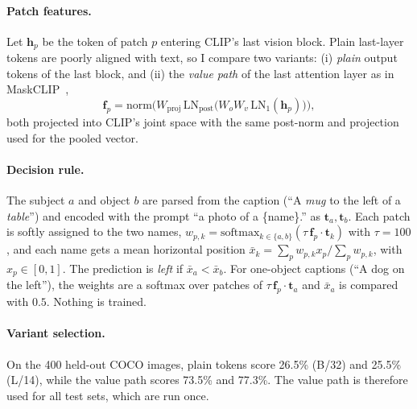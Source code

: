 \documentclass[10pt,twocolumn,letterpaper]{article}
\begin{document}
\paragraph{Patch features.}
Let $\mathbf{h}_p$ be the token of patch $p$ entering CLIP's last vision block.
Plain last-layer tokens are poorly aligned with text, so I compare two variants:
(i) \emph{plain} output tokens of the last block, and
(ii) the \emph{value path} of the last attention layer as in MaskCLIP~\cite{zhou2022maskclip},
\begin{equation}
\mathbf{f}_p = \mathrm{norm}\big(W_\text{proj}\,\mathrm{LN}_\text{post}\big(W_o W_v\,\mathrm{LN}_1(\mathbf{h}_p)\big)\big),
\end{equation}
both projected into CLIP's joint space with the same post-norm and projection used for the pooled vector.

\paragraph{Decision rule.}
The subject $a$ and object $b$ are parsed from the caption (``A \emph{mug} to the left of a \emph{table}'') and encoded with the prompt ``a photo of a \{name\}.'' as $\mathbf{t}_a, \mathbf{t}_b$.
Each patch is softly assigned to the two names,
$w_{p,k} = \mathrm{softmax}_{k\in\{a,b\}}(\tau\,\mathbf{f}_p\!\cdot\!\mathbf{t}_k)$ with $\tau=100$,
and each name gets a mean horizontal position $\bar{x}_k = \sum_p w_{p,k}x_p / \sum_p w_{p,k}$, with $x_p\in[0,1]$.
The prediction is \emph{left} if $\bar{x}_a < \bar{x}_b$.
For one-object captions (``A dog on the left''), the weights are a softmax over patches of $\tau\,\mathbf{f}_p\!\cdot\!\mathbf{t}_a$ and $\bar{x}_a$ is compared with $0.5$.
Nothing is trained.

\paragraph{Variant selection.}
On the 400 held-out COCO images, plain tokens score 26.5\% (B/32) and 25.5\% (L/14), while the value path scores 73.5\% and 77.3\%.
The value path is therefore used for all test sets, which are run once.
\end{document}
